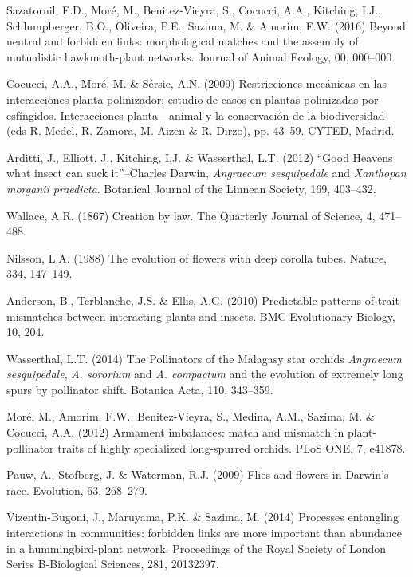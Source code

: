 \documentclass[a4paper,12pt]{article}
\begin{document}
\begin{thebibliography}{10}

Sazatornil, F.D., Moré, M., Benitez-Vieyra, S., Cocucci, A.A., Kitching, I.J., Schlumpberger, B.O., Oliveira, P.E., Sazima, M. \& Amorim, F.W. (2016) Beyond neutral and forbidden links: morphological matches and the assembly of mutualistic hawkmoth-plant networks. Journal of Animal Ecology, 00, 000–000.

Cocucci, A.A., Mor\'e, M. \& S\'ersic, A.N. (2009) Restricciones mec\'anicas en las interacciones planta-polinizador: estudio de casos en plantas polinizadas por esf\'ingidos. Interacciones planta---animal y la conservaci\'on de la biodiversidad (eds R. Medel, R. Zamora, M. Aizen \& R. Dirzo), pp. 43–59. CYTED, Madrid.

Arditti, J., Elliott, J., Kitching, I.J. \& Wasserthal, L.T. (2012) “Good Heavens what insect can suck it”–Charles Darwin, \textit{Angraecum sesquipedale} and \textit{Xanthopan morganii praedicta}. Botanical Journal of the Linnean Society, 169, 403–432.

Wallace, A.R. (1867) Creation by law. The Quarterly Journal of Science, 4, 471–488.

Nilsson, L.A. (1988) The evolution of flowers with deep corolla tubes. Nature, 334, 147–149.

Anderson, B., Terblanche, J.S. \& Ellis, A.G. (2010) Predictable patterns of trait mismatches between interacting plants and insects. BMC Evolutionary Biology, 10, 204.

Wasserthal, L.T. (2014) The Pollinators of the Malagasy star orchids \textit{Angraecum sesquipedale}, \textit{A. sororium} and \textit{A. compactum} and the evolution of extremely long spurs by pollinator shift. Botanica Acta, 110, 343–359.

Moré, M., Amorim, F.W., Benitez-Vieyra, S., Medina, A.M., Sazima, M. \& Cocucci, A.A. (2012) Armament imbalances: match and mismatch in plant-pollinator traits of highly specialized long-spurred orchids. PLoS ONE, 7, e41878.

Pauw, A., Stofberg, J. \& Waterman, R.J. (2009) Flies and flowers in Darwin's race. Evolution, 63, 268–279.

Vizentin-Bugoni, J., Maruyama, P.K. \& Sazima, M. (2014) Processes entangling interactions in communities: forbidden links are more important than abundance in a hummingbird-plant network. Proceedings of the Royal Society of London Series B-Biological Sciences, 281, 20132397.


\end{thebibliography}
\end{document}
